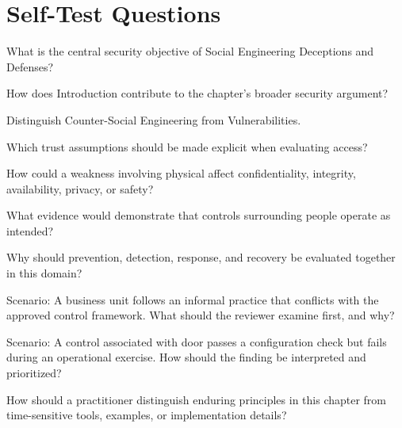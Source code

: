 \documentclass[11pt,letterpaper]{article}
\begin{document}
\section*{Self-Test Questions}
\begin{CornellRecallList}
\item What is the central security objective of Social Engineering Deceptions and Defenses?
\item How does Introduction contribute to the chapter's broader security argument?
\item Distinguish Counter-Social Engineering from Vulnerabilities.
\item Which trust assumptions should be made explicit when evaluating access?
\item How could a weakness involving physical affect confidentiality, integrity, availability, privacy, or safety?
\item What evidence would demonstrate that controls surrounding people operate as intended?
\item Why should prevention, detection, response, and recovery be evaluated together in this domain?
\item Scenario: A business unit follows an informal practice that conflicts with the approved control framework. What should the reviewer examine first, and why?
\item Scenario: A control associated with door passes a configuration check but fails during an operational exercise. How should the finding be interpreted and prioritized?
\item How should a practitioner distinguish enduring principles in this chapter from time-sensitive tools, examples, or implementation details?
\end{CornellRecallList}
\end{document}
